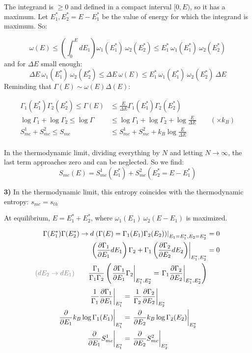The integrand is $\ge 0$ and defined in a compact interval $[0,E)$, so it has a maximum. Let $E_1^*, E_2^* = E-E_1^*$ be the value of energy for which the integrand is maximum. So:

$$ \omega(E) \le \left(\int_0^E dE_1\right) \omega_1(E_1^*)\  \omega_2(E_2^*) \le E_1^* \ \omega_1(E_1^*) \ \omega_2(E_2^*)
$$
and for $\Delta E$ small enough:
$$ \Delta E\  \omega_1(E_1^*)\ \omega_2 (E_2^*) \le \Delta E \ \omega (E) \le E_1^* \ \omega_1(E_1^*) \ \omega_2(E_2^*) \ \Delta E
$$
Reminding that $\Gamma(E) \sim \omega(E)\Delta(E)$:

\begin{align*}
\Gamma_1(E_1^*)\Gamma_2(E_2^*) \le \Gamma(E) &\le \frac E{\Delta E} \Gamma_1 (E_1^*) \Gamma_2 (E_2^*) \\
\log\Gamma_1 + \log\Gamma_2 \le \log \Gamma &\le \log\Gamma_1 + \log \Gamma_2 + \log \frac E{\Delta E} \qquad (\times k_B) \\
S_{mc}^1 + S_{mc}^2 \le S_{mc} &\le S_{mc}^1 + S_{mc}^2 + k_B \log \frac E{\Delta E} \\
\end{align*}

In the thermodynamic limit, dividing everything by $N$ and letting $N\to \infty$, the last term approaches zero and can be neglected. So we find:
$$ S_{mc}(E) = S_{mc}^1(E_1^*) + S_{mc}^2(E_2^* = E-E_1^*)$$

\EndPf

\textbf{3)} In the thermodynamic limit, this entropy coincides with the thermodynamic entropy: $s_{mc} = s_{th}$ 

\Pf At equilibrium, $E = E_1^* + E_2^*$, where $\omega_1(E_1) \ \omega_2(E-E_1)$ is maximized.

\begin{align*}
    \Gamma(E_1^*) \Gamma(E_2^*) \to d\left.\left(\Gamma(E) = \Gamma_1(E_1) \Gamma_2(E_2)\right)\right|_{E_1 = E_1^*, E_2 = E_2^*} &= 0 \\
    \left.\left(\der{\Gamma_1}{E_1} dE_1\right) \Gamma_2 + \Gamma_1 \left(\der{\Gamma_2}{E_2} dE_2\right)\right|_{E_1^*, E_2^*} &= 0 \\
    \gray{(dE_2 \to dE_1)} \qquad \frac{\Gamma_1}{\Gamma_1\Gamma_2}\left(\left.\der{\Gamma_1}{E_1} \Gamma_2 \right|_{E_1^*, E_2^*} = \left.\Gamma_1\der{\Gamma_2}{E_2}\right|_{E_1^*, E_2^*}\right)
\end{align*}
\begin{align*}
    \left.\frac 1{\Gamma_1} \frac{\partial\Gamma_1}{\partial E_1}\right|_{E_1^*} &= \left.\frac 1{\Gamma_2} \frac{\partial\Gamma_2}{\partial E_2}\right|_{E_2^*} \\
    \left.\frac{\partial}{\partial E_1} k_B\log\Gamma_1(E_1)\right|_{E_1^*} &= \left.\frac{\partial}{\partial E_2} k_B\log\Gamma_2(E_2)\right|_{E_2^*} \\
    \left.\frac{\partial}{\partial E_1} S_{mc}^1\right|_{E_1^*} &= \left.\frac{\partial}{\partial E_2} S_{mc}^2\right|_{E_2^*} \\
\end{align*}

